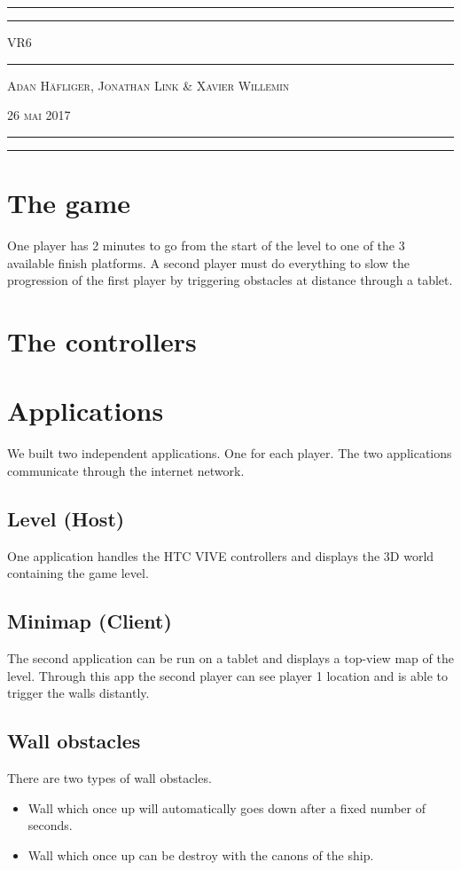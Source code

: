 \documentclass[12pt]{article}
\newcommand{\titleAT}{\begingroup %
\newlength{\drop} %
\drop=0.07\textheight %

\rule{\textwidth}{1pt}\par %
\vspace{2pt}\vspace{-\baselineskip} %
\rule{\textwidth}{0.4pt}\par %

\vspace{\drop} %
\centering %
{\Huge VR6}\\ %

\vspace{\drop} %
\rule{0.3\textwidth}{0.4pt}\par %
\vspace{\drop} %

{\large \textsc{Adan Häfliger, Jonathan Link \& Xavier Willemin}}\par %

\bigskip
\bigskip

{\small \textsc{26 mai 2017}}\par %

\vfill %

\begin{figure}[!h]
	\centering
\end{figure}

\bigskip

\rule{\textwidth}{0.4pt}\par %
\vspace{2pt}\vspace{-\baselineskip} %
\rule{\textwidth}{1pt}\par %

\thispagestyle{empty}

\endgroup}
\begin{document}
\titleAT

\newpage

\tableofcontents

\newpage

\section{The game}
One player has 2 minutes to go from the start of the level to one of the 3 available finish platforms. A second player must do everything to slow the progression of the first player by triggering obstacles at distance through a tablet.

\section{The controllers}

\section{Applications}
We built two independent applications. One for each player. The two applications communicate through the internet network.

\subsection{Level (Host)}
One application handles the HTC VIVE controllers and displays the 3D world containing the game level.

\subsection{Minimap (Client)}
The second application can be run on a tablet and displays a top-view map of the level. Through this app the second player can see  player 1 location and is able to trigger the walls distantly.

\subsection{Wall obstacles}
There are two types of wall obstacles.

\begin{itemize}  
\item Wall which once up will automatically goes down after a fixed number of seconds.
\item Wall which once up can be destroy with the canons of the ship.
\end{itemize}
\end{document}
